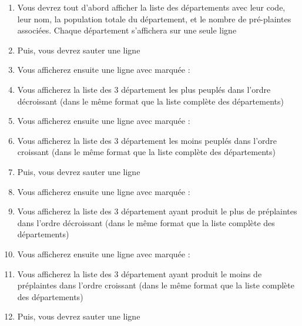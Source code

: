 \begin{enumerate}
\itemindent=-13pt

\item Vous devrez tout d'abord afficher la liste des départements avec leur code, leur nom, la population totale du département, et le nombre de pré-plaintes associées.
Chaque département s'affichera sur une seule ligne

\item Puis, vous devrez sauter une ligne

\item Vous afficherez ensuite une ligne avec marquée :\\
\og {} \fg{}

\item Vous afficherez la liste des 3 département les plus peuplés dans l'ordre décroissant (dans le même format que la liste complète des départements)

\item Vous afficherez ensuite une ligne avec marquée :\\
\og {} \fg{}

\item Vous afficherez la liste des 3 département les moins peuplés dans l'ordre croissant (dans le même format que la liste complète des départements)

\item Puis, vous devrez sauter une ligne

\item Vous afficherez ensuite une ligne avec marquée :\\
\og {} \fg{}

\item Vous afficherez la liste des 3 département ayant produit le plus de préplaintes dans l'ordre décroissant (dans le même format que la liste complète des départements)

\item Vous afficherez ensuite une ligne avec marquée :\\
\og {} \fg{}

\item Vous afficherez la liste des 3 département ayant produit le moins de préplaintes dans l'ordre croissant (dans le même format que la liste complète des départements)

\item Puis, vous devrez sauter une ligne


\end{enumerate}
